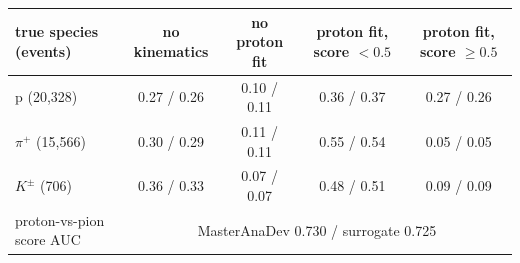 \begin{tabular}{lcccc}
\toprule
true species (events) & no kinematics & no proton fit & proton fit, score $<0.5$ & proton fit, score $\geq 0.5$ \\
\midrule
p (20,328) & 0.27 / 0.26 & 0.10 / 0.11 & 0.36 / 0.37 & 0.27 / 0.26 \\
$\pi^+$ (15,566) & 0.30 / 0.29 & 0.11 / 0.11 & 0.55 / 0.54 & 0.05 / 0.05 \\
$K^\pm$ (706) & 0.36 / 0.33 & 0.07 / 0.07 & 0.48 / 0.51 & 0.09 / 0.09 \\
\midrule
proton-vs-pion score AUC & \multicolumn{4}{c}{MasterAnaDev 0.730 / surrogate 0.725} \\
\bottomrule
\end{tabular}
